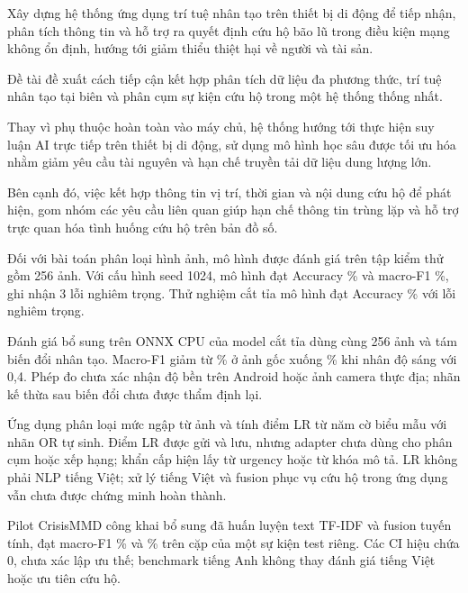 
Xây dựng hệ thống ứng dụng trí tuệ nhân tạo trên thiết bị di động để tiếp nhận, phân tích thông tin và hỗ trợ ra quyết định cứu hộ bão lũ trong điều kiện mạng không ổn định, hướng tới giảm thiểu thiệt hại về người và tài sản.

Đề tài đề xuất cách tiếp cận kết hợp phân tích dữ liệu đa phương thức, trí tuệ nhân tạo tại biên và phân cụm sự kiện cứu hộ trong một hệ thống thống nhất.

Thay vì phụ thuộc hoàn toàn vào máy chủ, hệ thống hướng tới thực hiện suy luận AI trực tiếp trên thiết bị di động, sử dụng mô hình học sâu được tối ưu hóa nhằm giảm yêu cầu tài nguyên và hạn chế truyền tải dữ liệu dung lượng lớn.

Bên cạnh đó, việc kết hợp thông tin vị trí, thời gian và nội dung cứu hộ để phát hiện, gom nhóm các yêu cầu liên quan giúp hạn chế thông tin trùng lặp và hỗ trợ trực quan hóa tình huống cứu hộ trên bản đồ số.

Đối với bài toán phân loại hình ảnh, mô hình được đánh giá trên tập kiểm thử gồm 256 ảnh. Với cấu hình seed 1024, mô hình đạt Accuracy \NewImageAccuracy\% và macro-F1 \NewImageMacroFOne\%, ghi nhận 3 lỗi nghiêm trọng. Thử nghiệm cắt tỉa mô hình đạt Accuracy \PruningAccuracy\% với \PruningCriticalCount{} lỗi nghiêm trọng.

Đánh giá bổ sung trên ONNX CPU của model cắt tỉa dùng cùng 256 ảnh và tám biến đổi nhân tạo. Macro-F1 giảm từ \QualityCleanMacroFOne\% ở ảnh gốc xuống \QualityDarkMacroFOne\% khi nhân độ sáng với 0,4. Phép đo chưa xác nhận độ bền trên Android hoặc ảnh camera thực địa; nhãn kế thừa sau biến đổi chưa được thẩm định lại.

Ứng dụng phân loại mức ngập từ ảnh và tính điểm LR từ năm cờ biểu mẫu với nhãn OR tự sinh. Điểm LR được gửi và lưu, nhưng adapter chưa dùng cho phân cụm hoặc xếp hạng; khẩn cấp hiện lấy từ urgency hoặc từ khóa mô tả. LR không phải NLP tiếng Việt; xử lý tiếng Việt và fusion phục vụ cứu hộ trong ứng dụng vẫn chưa được chứng minh hoàn thành.

Pilot CrisisMMD công khai bổ sung đã huấn luyện text TF-IDF và fusion tuyến tính, đạt macro-F1 \MMTextFOne\% và \MMFusionFOne\% trên \MMTestN{} cặp của một sự kiện test riêng. Các CI hiệu chứa 0, chưa xác lập ưu thế; benchmark tiếng Anh không thay đánh giá tiếng Việt hoặc ưu tiên cứu hộ.

